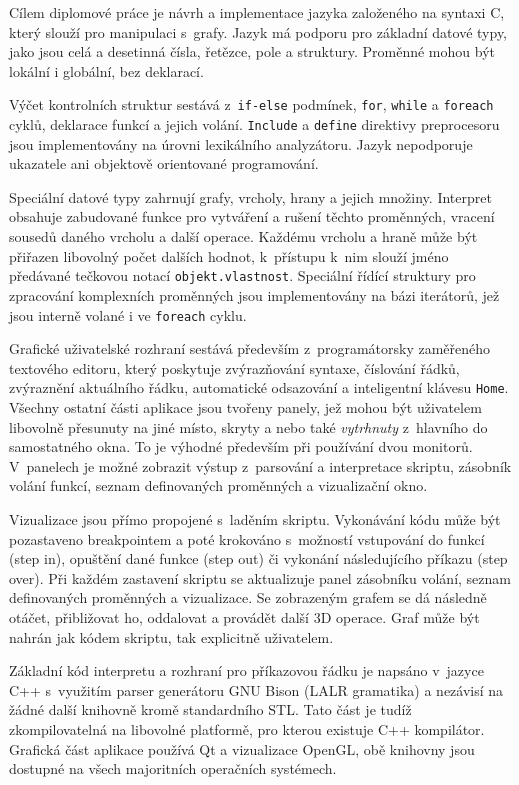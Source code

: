 \documentclass[11pt,twoside,a4paper]{book}
\begin{document}
Cílem diplomové práce je návrh a implementace jazyka založeného na syntaxi C, který slouží pro manipulaci s~grafy. Jazyk má podporu pro základní datové typy, jako jsou celá a desetinná čísla, řetězce, pole a struktury. Proměnné mohou být lokální i globální, bez deklarací.

Výčet kontrolních struktur sestává z~\texttt{if-else} podmínek, \texttt{for}, \texttt{while} a \texttt{foreach} cyklů, deklarace funkcí a jejich volání. \texttt{Include} a \texttt{define} direktivy preprocesoru jsou implementovány na úrovni lexikálního analyzátoru. Jazyk nepodporuje ukazatele ani objektově orientované programování.

Speciální datové typy zahrnují grafy, vrcholy, hrany a jejich množiny. Interpret obsahuje zabudované funkce pro vytváření a rušení těchto proměnných, vracení sousedů daného vrcholu a další operace. Každému vrcholu a hraně může být přiřazen libovolný počet dalších hodnot, k~přístupu k~nim slouží jméno předávané tečkovou notací \texttt{objekt.vlastnost}. Speciální řídící struktury pro zpracování komplexních proměnných jsou implementovány na bázi iterátorů, jež jsou interně volané i ve \texttt{foreach} cyklu.

Grafické uživatelské rozhraní sestává především z~programátorsky zaměřeného textového editoru, který poskytuje zvýrazňování syntaxe, číslování řádků, zvýraznění aktuálního řádku, automatické odsazování a inteligentní klávesu \texttt{Home}. Všechny ostatní části aplikace jsou tvořeny panely, jež mohou být uživatelem libovolně přesunuty na jiné místo, skryty a nebo také \textit{vytrhnuty} z~hlavního do samostatného okna. To je výhodné především při používání dvou monitorů. V~panelech je možné zobrazit výstup z~parsování a interpretace skriptu, zásobník volání funkcí, seznam definovaných proměnných a vizualizační okno.

Vizualizace jsou přímo propojené s~laděním skriptu. Vykonávání kódu může být pozastaveno breakpointem a poté krokováno s~možností vstupování do funkcí (step in), opuštění dané funkce (step out) či vykonání následujícího příkazu (step over). Při každém zastavení skriptu se aktualizuje panel zásobníku volání, seznam definovaných proměnných a vizualizace. Se zobrazeným grafem se dá následně otáčet, přibližovat ho, oddalovat a provádět další 3D operace. Graf může být nahrán jak kódem skriptu, tak explicitně uživatelem.

Základní kód interpretu a rozhraní pro příkazovou řádku je napsáno v~jazyce C++ s~využitím parser generátoru GNU Bison (LALR gramatika) a nezávisí na žádné další knihovně kromě standardního STL. Tato část je tudíž zkompilovatelná na libovolné platformě, pro kterou existuje C++ kompilátor. Grafická část aplikace používá Qt a vizualizace OpenGL, obě knihovny jsou dostupné na všech majoritních operačních systémech.
\end{document}
